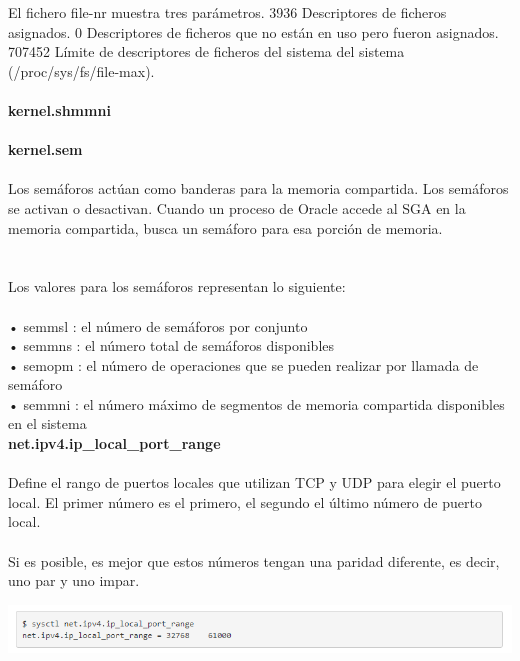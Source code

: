 El fichero file-nr muestra tres parámetros. 3936 Descriptores de ficheros asignados. 0 Descriptores de ficheros que no están en uso pero fueron asignados. 707452 Límite de descriptores de ficheros del sistema del sistema (/proc/sys/fs/file-max).\\ \\
{\bfseries kernel.shmmni}
\\
\\

{\bfseries  kernel.sem}
\\
\\Los semáforos actúan como banderas para la memoria compartida. Los semáforos se activan o desactivan. Cuando un proceso de Oracle accede al SGA en la memoria compartida, busca un semáforo para esa porción de memoria. \\
\\
\\Los valores para los semáforos representan lo siguiente:\\
\\•	semmsl : el número de semáforos por conjunto
\\•	semmns : el número total de semáforos disponibles
\\•	semopm : el número de operaciones que se pueden realizar por llamada de semáforo
\\•	semmni : el número máximo de segmentos de memoria compartida disponibles en el sistema
\\

{\bfseries  net.ipv4.ip\_local\_port\_range}
\\
\\Define el rango de puertos locales que utilizan TCP y UDP para elegir el puerto local. El primer número es el primero, el segundo el último número de puerto local. \\
\\Si es posible, es mejor que estos números tengan una paridad diferente, es decir, uno par y uno impar. 
\\
	\begin{center}
		\includegraphics[width=17cm]{./Imagenes/c} 
	\end{center} 

